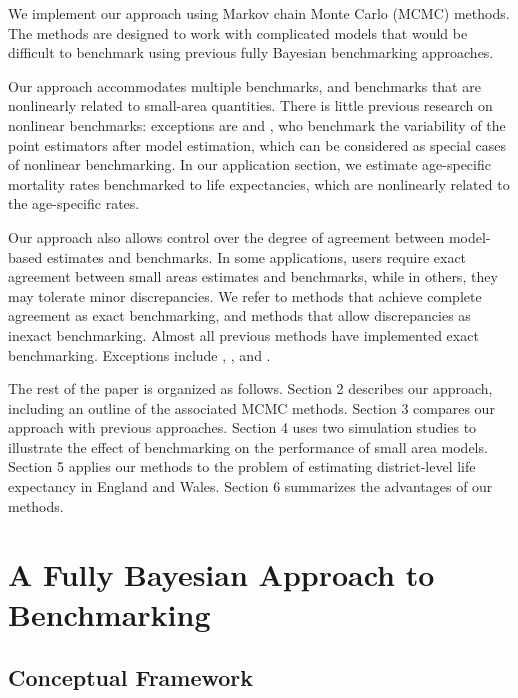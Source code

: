 \documentclass[12pt]{article}
\begin{document}
We implement our approach using Markov chain Monte Carlo (MCMC) methods.  The methods are designed to work with complicated models that would be difficult to benchmark using previous fully Bayesian benchmarking approaches.

Our approach accommodates multiple benchmarks, and benchmarks that are nonlinearly related to small-area quantities.  There is little previous research on nonlinear benchmarks: exceptions are \citet{datta2011bayesian} and \citet{fabrizi2012constrained}, who benchmark the variability of the point estimators after model estimation, which can be considered as special cases of nonlinear benchmarking.  In our application section, we estimate age-specific mortality rates benchmarked to life expectancies, which are nonlinearly related to the age-specific rates.

 Our approach also allows control over the degree of agreement between model-based estimates and benchmarks. In some applications, users require exact agreement between small areas estimates and benchmarks, while in others, they may tolerate minor discrepancies.  We refer to methods that achieve complete agreement as exact benchmarking, and methods that allow discrepancies as inexact benchmarking.  Almost all previous methods have implemented exact benchmarking.  Exceptions include \citet[][Section 2]{bell2013benchmarking}, \citet{nandram2011constraint}, and \citet{vesper2013three}.

The rest of the paper is organized as follows.  Section 2 describes our approach, including an outline of the associated MCMC methods.  Section 3 compares our approach with previous approaches.  Section 4 uses two simulation studies to illustrate the effect of benchmarking on the performance of small area models.  Section 5 applies our methods to the problem of estimating district-level life expectancy in England and Wales.  Section 6 summarizes the advantages of our methods.

\section{A Fully Bayesian Approach to Benchmarking}
  \label{sec:bayesian_interpretation}

\subsection{Conceptual Framework}
  \label{sec:problem}
\end{document}
